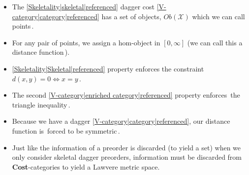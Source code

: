 \begin{itemize}
    \item The \ref{Skeletality|skeletal|referenced} dagger cost \ref{V-category|category|referenced} has a set of objects, $Ob(\mathcal{X})$ which we can call \,points\,.
    \item For any pair of points, we assign a hom-object in $[0,\infty]$ (we can call this a \,distance function\,).
    \item \ref{Skeletality|Skeletal|referenced} property enforces the constraint \,$d(x,y)=0 \iff x=y$\,.
    \item The second \ref{V-category|enriched category|referenced} property enforces \,the triangle inequality\,.
    \item Because we have a dagger \ref{V-category|category|referenced}, our distance function is \,forced to be symmetric\,.
    \item Just like the information of a preorder is discarded (to yield a set) when we only consider skeletal dagger preorders, information must be discarded from \textbf{Cost}-categories to yield a Lawvere metric space.

  \end{itemize}
